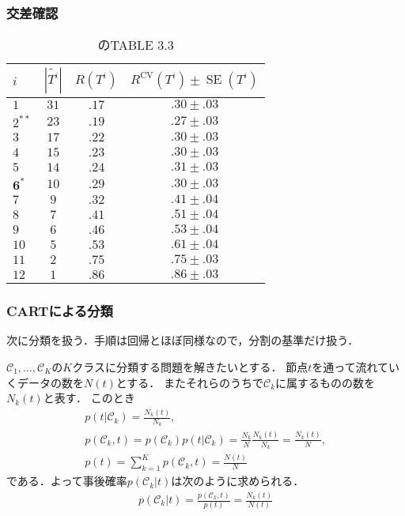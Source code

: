 \documentclass[10pt,hyperref={unicode}]{beamer}
\DeclareMathOperator*{\SE}{SE}
\newcommand{\absolute}[1]{\left|#1\right|}
\newcommand{\parentheses}[1]{\left(#1\right)}
\begin{document}
\begin{frame}
\frametitle{交差確認}
\begin{table}
\caption{\cite{breiman1984}のTABLE 3.3}
{\renewcommand{\arraystretch}{1.3}
{\footnotesize
\begin{tabular}{lccc}
\hline
$i$  & $\absolute{\widetilde{T^i}}$  & $R\parentheses{T^i}$ & $R^{\mathrm{CV}}\parentheses{T^i} \pm \SE\parentheses{T^i}$ \\
\hline
$1$  & $31$ & $.17$ & $.30 \pm .03$  \\
$2^{**}$  & $23$ & $.19$ & $\bm{.27 \pm .03}$ \\
$3$  & $17$ & $.22$ & $.30 \pm .03$  \\
$4$  & $15$ & $.23$ & $.30 \pm .03$  \\
$5$  & $14$ & $.24$ & $.31 \pm .03$  \\
$\bm{6}^*$  & $10$ & $.29$ & $.30 \pm .03$  \\
$7$  & $9$  & $.32$ & $.41 \pm .04$ \\
$8$  & $7$  & $.41$ & $.51 \pm .04$   \\
$9$  & $6$  & $.46$ & $.53 \pm .04$ \\
$10$ & $5$  & $.53$ & $.61 \pm .04$ \\
$11$ & $2$  & $.75$ & $.75 \pm .03$  \\
$12$ & $1$  & $.86$ & $.86 \pm .03$ \\
\hline
\end{tabular}
}
}
\end{table}
\end{frame}


\begin{frame}
\nocite{hajipata}
\frametitle{CARTによる分類}
次に分類を扱う．手順は回帰とほぼ同様なので，分割の基準だけ扱う．

\bigskip

$\mathcal{C}_1,\ldots,\mathcal{C}_K$の$K$クラスに分類する問題を解きたいとする．
節点$t$を通って流れていくデータの数を$N\parentheses{t}$とする．
またそれらのうちで$\mathcal{C}_k$に属するものの数を$N_k\parentheses{t}$と表す．
このとき
\begin{gather*}
    p\parentheses{t|\mathcal{C}_k}
    = \frac{N_k\parentheses{t}}{N_k},\\
    p\parentheses{\mathcal{C}_k,t}
    = p\parentheses{\mathcal{C}_k}p\parentheses{t|\mathcal{C}_k}
    = \frac{N_k}{N} \frac{N_k\parentheses{t}}{N_k}
    = \frac{N_k\parentheses{t}}{N},\\
    p\parentheses{t}
    = \sum_{k = 1}^K p\parentheses{\mathcal{C}_k,t}
    = \frac{N\parentheses{t}}{N}
\end{gather*}
である．よって事後確率$p\parentheses{\mathcal{C}_k|t}$は次のように求められる．
\begin{align*}
    p\parentheses{\mathcal{C}_k|t}
    = \frac{p\parentheses{\mathcal{C}_k, t}}{p\parentheses{t}}
    = \frac{N_k\parentheses{t}}{N\parentheses{t}}
\end{align*}
\end{frame}
\end{document}
